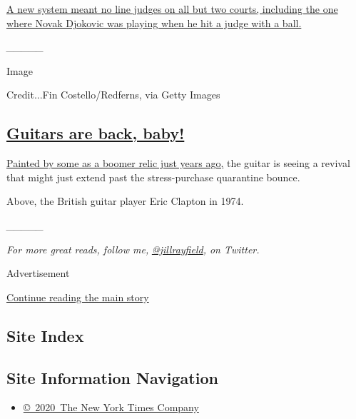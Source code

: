\href{https://www.nytimes3xbfgragh.onion/2020/09/10/sports/tennis/us-open-hawk-eye-live-novak-djokovic.html}{A
new system meant no line judges on all but two courts, including the one
where Novak Djokovic was playing when he hit a judge with a ball.}

\emph{\_\_\_\_\_}

Image

Credit...Fin Costello/Redferns, via Getty Images

\hypertarget{guitars-are-back-baby}{%
\subsection{\texorpdfstring{\href{https://www.nytimes3xbfgragh.onion/2020/09/08/style/guitar-sales-fender-gibson.html}{Guitars
are back,
baby!}}{Guitars are back, baby!}}\label{guitars-are-back-baby}}

\href{https://www.nytimes3xbfgragh.onion/2020/09/08/style/guitar-sales-fender-gibson.html}{Painted
by some as a boomer relic just years ago,} the guitar is seeing a
revival that might just extend past the stress-purchase quarantine
bounce.

Above, the British guitar player Eric Clapton in 1974.

\emph{\_\_\_\_\_}

\emph{For more great reads, follow me,}
\href{https://twitter.com/jillrayfield}{\emph{@jillrayfield}}\emph{, on
Twitter.}

Advertisement

\protect\hyperlink{after-bottom}{Continue reading the main story}

\hypertarget{site-index}{%
\subsection{Site Index}\label{site-index}}

\hypertarget{site-information-navigation}{%
\subsection{Site Information
Navigation}\label{site-information-navigation}}

\begin{itemize}
\tightlist
\item
  \href{https://help.nytimes3xbfgragh.onion/hc/en-us/articles/115014792127-Copyright-notice}{©~2020~The
  New York Times Company}
\end{itemize}

